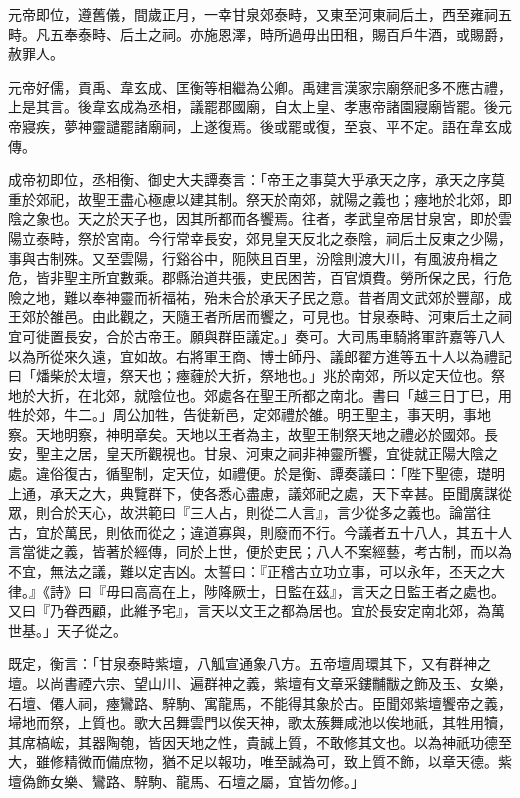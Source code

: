 \begin{pinyinscope}
元帝即位，遵舊儀，間歲正月，一幸甘泉郊泰畤，又東至河東祠后土，西至雍祠五畤。凡五奉泰畤、后土之祠。亦施恩澤，時所過毋出田租，賜百戶牛酒，或賜爵，赦罪人。

元帝好儒，貢禹、韋玄成、匡衡等相繼為公卿。禹建言漢家宗廟祭祀多不應古禮，上是其言。後韋玄成為丞相，議罷郡國廟，自太上皇、孝惠帝諸園寢廟皆罷。後元帝寢疾，夢神靈譴罷諸廟祠，上遂復焉。後或罷或復，至哀、平不定。語在韋玄成傳。

成帝初即位，丞相衡、御史大夫譚奏言：「帝王之事莫大乎承天之序，承天之序莫重於郊祀，故聖王盡心極慮以建其制。祭天於南郊，就陽之義也；瘞地於北郊，即陰之象也。天之於天子也，因其所都而各饗焉。往者，孝武皇帝居甘泉宮，即於雲陽立泰畤，祭於宮南。今行常幸長安，郊見皇天反北之泰陰，祠后土反東之少陽，事與古制殊。又至雲陽，行谿谷中，阨陝且百里，汾陰則渡大川，有風波舟楫之危，皆非聖主所宜數乘。郡縣治道共張，吏民困苦，百官煩費。勞所保之民，行危險之地，難以奉神靈而祈福祐，殆未合於承天子民之意。昔者周文武郊於豐鄗，成王郊於雒邑。由此觀之，天隨王者所居而饗之，可見也。甘泉泰畤、河東后土之祠宜可徙置長安，合於古帝王。願與群臣議定。」奏可。大司馬車騎將軍許嘉等八人以為所從來久遠，宜如故。右將軍王商、博士師丹、議郎翟方進等五十人以為禮記曰「燔柴於太壇，祭天也；瘞薶於大折，祭地也。」兆於南郊，所以定天位也。祭地於大折，在北郊，就陰位也。郊處各在聖王所都之南北。書曰「越三日丁巳，用牲於郊，牛二。」周公加牲，告徙新邑，定郊禮於雒。明王聖主，事天明，事地察。天地明察，神明章矣。天地以王者為主，故聖王制祭天地之禮必於國郊。長安，聖主之居，皇天所觀視也。甘泉、河東之祠非神靈所饗，宜徙就正陽大陰之處。違俗復古，循聖制，定天位，如禮便。於是衡、譚奏議曰：「陛下聖德，璴明上通，承天之大，典覽群下，使各悉心盡慮，議郊祀之處，天下幸甚。臣聞廣謀從眾，則合於天心，故洪範曰『三人占，則從二人言』，言少從多之義也。論當往古，宜於萬民，則依而從之；違道寡與，則廢而不行。今議者五十八人，其五十人言當徙之義，皆著於經傳，同於上世，便於吏民；八人不案經藝，考古制，而以為不宜，無法之議，難以定吉凶。太誓曰：『正稽古立功立事，可以永年，丕天之大律。』《詩》曰『毋曰高高在上，陟降厥士，日監在茲』，言天之日監王者之處也。又曰『乃眷西顧，此維予宅』，言天以文王之都為居也。宜於長安定南北郊，為萬世基。」天子從之。

既定，衡言：「甘泉泰畤紫壇，八觚宣通象八方。五帝壇周環其下，又有群神之壇。以尚書禋六宗、望山川、遍群神之義，紫壇有文章采鏤黼黻之飾及玉、女樂，石壇、僊人祠，瘞鸞路、騂駒、寓龍馬，不能得其象於古。臣聞郊紫壇饗帝之義，埽地而祭，上質也。歌大呂舞雲門以俟天神，歌太蔟舞咸池以俟地祇，其牲用犢，其席槁峵，其器陶匏，皆因天地之性，貴誠上質，不敢修其文也。以為神祇功德至大，雖修精微而備庶物，猶不足以報功，唯至誠為可，致上質不飾，以章天德。紫壇偽飾女樂、鸞路、騂駒、龍馬、石壇之屬，宜皆勿修。」


\end{pinyinscope}

